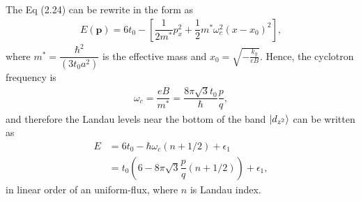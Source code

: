 \documentclass{report}
\newcommand{\f}[2]{\dfrac{#1}{#2}}
\begin{document}
The Eq (2.24) can be rewrite in the form as
\begin{gather}
	E(\mathbf{p}) = 6 t_{0} - \left[\f{1}{2m^{*}} p_{x}^{2} + \f{1}{2} m^{*} \omega_{c}^{2}(x - x_{0})^{2}\right],
\end{gather}
where $m^{*} = \f{\hbar^{2}}{(3t_{0}a^{2}) }$ is the effective mass and $x_{0} = \sqrt{-\frac{k_{y}}{eB}}$. Hence, the cyclotron frequency is
\begin{gather}
	\omega_{c} = \f{eB}{m^{*}} = \f{8 \pi \sqrt{3} t_{0}}{\hbar}  \f{p}{q},
\end{gather}
and therefore the Landau levels near the bottom of the band $\ket{d_{z^{2}}}$ can be written as
\begin{equation}
	\begin{aligned}
		E
		 & = 6 t_{0} - \hbar \omega_{c} (n + 1 /2) + \epsilon_{1}                    \\
		 & = t_{0} \left(6 - 8\pi\sqrt{3} \f{p}{q}( n + 1 /2)\right) + \epsilon_{1},
	\end{aligned}
\end{equation}
in linear order of an uniform-flux, where $n$ is Landau index.
\end{document}

